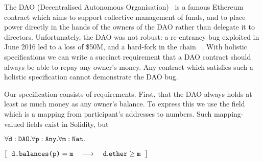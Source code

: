 The DAO  {(Decentralised Autonomous Organisation)}~\cite{Dao}  is a famous Ethereum contract  which aims to support
collective management of funds,  and to place power directly in the
hands of the owners of the DAO
rather than delegate it to directors.
Unfortunately, the DAO was not robust:
a re-entrancy bug   exploited in June 2016 led  to a loss of   \$50M, and
a hard-fork in the  chain ~\cite{DaoBug}.
%
With holistic specifications  we can  write a succinct requirement that a
DAO contract should always be able to repay any owner's money.
Any contract which satisfies such a holistic specification cannot demonstrate the DAO bug.
 
Our specification consists of  requirements.
First, that the DAO always holds at least as 
much money as any owner's balance.
To express this we use 
the field  which is a mapping from participant's addresses to 
numbers. Such mapping-valued fields exist in Solidity, but 
  
\vspace{.1cm}

\noindent
 \strut \hspace{0.5cm} $\forall {\mbox{\tt{d}}}:{\mbox{\tt{DAO}}}.\forall {\mbox{\tt{p}}}:{\mbox{\tt{Any}}}.\forall{\mbox{\tt{m}}}:{\mbox{\tt{Nat}}}.$\\
\strut \hspace{0.5cm} $[\ \ \prg{d.balances(p)}=\prg{m}  \ \ \  \longrightarrow  \ \ \ \prg{d}.\prg{ether}\geq \prg{m} \ \ ] $

 

